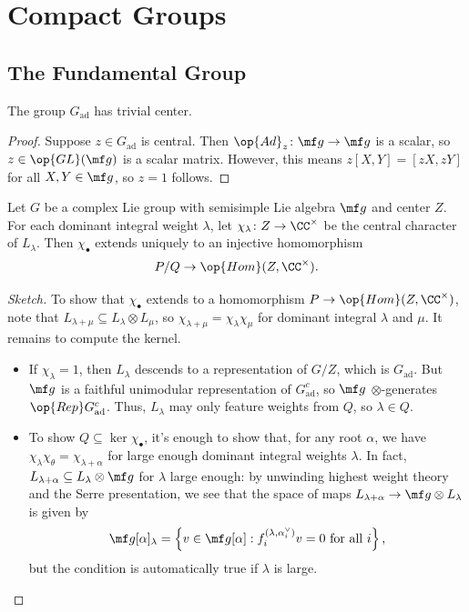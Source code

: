 \documentclass{article}
\begin{document}
\section{Compact Groups}

\subsection{The Fundamental Group}
\begin{lemma}
	The group $G_{\mathrm{ad}}$ has trivial center.
\end{lemma}
\begin{proof}
	Suppose $z\in G_{\mathrm{ad}}$ is central. Then $\op{Ad}_z\colon\mf g\to\mf g$ is a scalar, so $z\in\op{GL}(\mf g)$ is a scalar matrix. However, this means $z[X,Y]=[zX,zY]$ for all $X,Y\in\mf g$, so $z=1$ follows.
\end{proof}
\begin{proposition}
	Let $G$ be a complex Lie group with semisimple Lie algebra $\mf g$ and center $Z$. For each dominant integral weight $\lambda$, let $\chi_\lambda\colon Z\to\CC^\times$ be the central character of $L_\lambda$. Then $\chi_\bullet$ extends uniquely to an injective homomorphism
	\[P/Q\to\op{Hom}(Z,\CC^\times).\]
\end{proposition}
\begin{proof}[Sketch]
	To show that $\chi_\bullet$ extends to a homomorphism $P\to\op{Hom}(Z,\CC^\times)$, note that $L_{\lambda+\mu}\subseteq L_\lambda\otimes L_\mu$, so $\chi_{\lambda+\mu}=\chi_\lambda\chi_\mu$ for dominant integral $\lambda$ and $\mu$. It remains to compute the kernel.
	\begin{itemize}
		\item If $\chi_\lambda=1$, then $L_\lambda$ descends to a representation of $G/Z$, which is $G_{\mathrm{ad}}$. But $\mf g$ is a faithful unimodular representation of $G_{\mathrm{ad}}^c$, so $\mf g$ $\otimes$-generates $\op{Rep}G_{\mathrm{ad}}^c$. Thus, $L_\lambda$ may only feature weights from $Q$, so $\lambda\in Q$.
		\item To show $Q\subseteq\ker\chi_\bullet$, it's enough to show that, for any root $\alpha$, we have $\chi_\lambda\chi_\theta=\chi_{\lambda+\alpha}$ for large enough dominant integral weights $\lambda$. In fact, $L_{\lambda+\alpha}\subseteq L_\lambda\otimes\mf g$ for $\lambda$ large enough: by unwinding highest weight theory and the Serre presentation, we see that the space of maps $L_{\lambda+\alpha}\to\mf g\otimes L_\lambda$ is given by
		\[\mf g[\alpha]_\lambda=\left\{v\in\mf g[\alpha]:f_i^{(\lambda,\alpha_i^\lor)}v=0\text{ for all }i\right\},\]
		but the condition is automatically true if $\lambda$ is large.
		\qedhere
	\end{itemize}
\end{proof}
\end{document}
